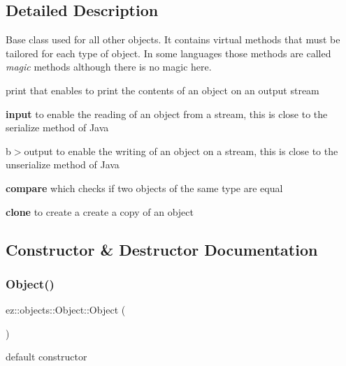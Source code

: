 \subsection{Detailed Description}
Base class used for all other objects. It contains virtual methods that must be tailored for each type of object. In some languages those methods are called {\itshape magic} methods although there is no magic here. 
\begin{DoxyItemize}
\item print that enables to print the contents of an object on an output stream 
\item {\bfseries input} to enable the reading of an object from a stream, this is close to the serialize method of Java 
\item b$>$output to enable the writing of an object on a stream, this is close to the unserialize method of Java 
\item {\bfseries compare} which checks if two objects of the same type are equal 
\item {\bfseries clone} to create a create a copy of an object  
\end{DoxyItemize}

\subsection{Constructor \& Destructor Documentation}
\mbox{\label{classez_1_1objects_1_1Object_a0c3d39046853c0eb87924e0268063175}} 
\subsubsection{\texorpdfstring{Object()}{Object()}}
{\footnotesize\ttfamily ez\+::objects\+::\+Object\+::\+Object (\begin{DoxyParamCaption}{ }\end{DoxyParamCaption})\hspace{0.3cm}{\ttfamily [inline]}}

default constructor \mbox{\label{classez_1_1objects_1_1Object_a4c17ee2010ca61cf917962e2ba6bb5c5}} 
